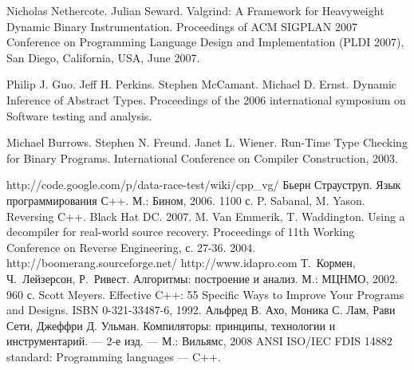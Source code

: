 \documentclass[a4paper,12pt,russian]{article}
\newcommand{\code}[1]{\textsf{#1}}
\begin{document}
\newpage
{}
\begin{thebibliography}{9}

     Nicholas Nethercote. Julian Seward. Valgrind: A Framework for Heavyweight Dynamic Binary Instrumentation. Proceedings of ACM SIGPLAN 2007 Conference on Programming Language Design and Implementation (PLDI 2007), San Diego, California, USA, June 2007.

     Philip J. Guo. Jeff H. Perkins. Stephen McCamant. Michael D. Ernst. Dynamic Inference of Abstract Types. Proceedings of the 2006 international symposium on Software testing and analysis.

     Michael Burrows. Stephen N. Freund. Janet L. Wiener. Run-Time Type Checking for Binary Programs. International Conference on Compiler Construction, 2003.

     \code{http://code.google.com/p/data-race-test/wiki/cpp\_vg/}
     Бьерн Страуструп. Язык программирования С++. М.: Бином, 2006. 1100 с.
    P. Sabanal, M. Yason. Reversing C++. Black Hat DC. 2007.
     M. Van Emmerik, T. Waddington. Using a decompiler for real-world source recovery. Proceedings of 11th Working Conference on Reverse Engineering, с. 27-36. 2004.
     \code{http://boomerang.sourceforge.net/}
     \code{http://www.idapro.com}
     Т.~Кормен, Ч.~Лейзерсон, Р.~Ривест. Алгоритмы: построение и анализ. М.: МЦНМО, 2002. 960 с.
     Scott Meyers. Effective C++: 55 Specific Ways to Improve Your Programs and Designs. ISBN 0-321-33487-6, 1992.
     Альфред В. Ахо, Моника С. Лам, Рави Сети, Джеффри Д. Ульман. Компиляторы: принципы, технологии и инструментарий. — 2-е изд. — М.: Вильямс, 2008
     ANSI ISO/IEC FDIS 14882 standard: Programming languages --- C++.
\end{thebibliography}
\end{document}
